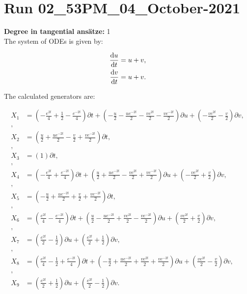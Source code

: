 \section*{Run 02\_53PM\_04\_October-2021}
\textbf{Degree in tangential ansätze:}	1\\
The system of ODEs is given by:

\begin{align*}
\dv{u}{t}&=u + v,\\
\dv{v}{t}&=u + v.\\
\end{align*}

\noindent The calculated generators are:

\begin{align*}
X_{1}&=\left( - \frac{e^{2 t}}{4} + \frac{1}{2} - \frac{e^{- 2 t}}{4} \right)\partial t+\left( - \frac{u}{2} - \frac{u e^{- 2 t}}{2} - \frac{v e^{2 t}}{2} - \frac{v e^{- 2 t}}{2} \right)\partial u+\left( - \frac{v e^{2 t}}{2} - \frac{v}{2} \right)\partial v,\\
,\\
X_{2}&=\left( \frac{u}{2} + \frac{u e^{- 2 t}}{2} - \frac{v}{2} + \frac{v e^{- 2 t}}{2} \right)\partial t,\\
,\\
X_{3}&=\left( 1 \right)\partial t,\\
,\\
X_{4}&=\left( - \frac{e^{2 t}}{4} + \frac{e^{- 2 t}}{4} \right)\partial t+\left( \frac{u}{2} + \frac{u e^{- 2 t}}{2} - \frac{v e^{2 t}}{2} + \frac{v e^{- 2 t}}{2} \right)\partial u+\left( - \frac{v e^{2 t}}{2} + \frac{v}{2} \right)\partial v,\\
,\\
X_{5}&=\left( - \frac{u}{2} + \frac{u e^{- 2 t}}{2} + \frac{v}{2} + \frac{v e^{- 2 t}}{2} \right)\partial t,\\
,\\
X_{6}&=\left( \frac{e^{2 t}}{4} - \frac{e^{- 2 t}}{4} \right)\partial t+\left( \frac{u}{2} - \frac{u e^{- 2 t}}{2} + \frac{v e^{2 t}}{2} - \frac{v e^{- 2 t}}{2} \right)\partial u+\left( \frac{v e^{2 t}}{2} + \frac{v}{2} \right)\partial v,\\
,\\
X_{7}&=\left( \frac{e^{2 t}}{2} - \frac{1}{2} \right)\partial u+\left( \frac{e^{2 t}}{2} + \frac{1}{2} \right)\partial v,\\
,\\
X_{8}&=\left( \frac{e^{2 t}}{4} - \frac{1}{2} + \frac{e^{- 2 t}}{4} \right)\partial t+\left( - \frac{u}{2} + \frac{u e^{- 2 t}}{2} + \frac{v e^{2 t}}{2} + \frac{v e^{- 2 t}}{2} \right)\partial u+\left( \frac{v e^{2 t}}{2} - \frac{v}{2} \right)\partial v,\\
,\\
X_{9}&=\left( \frac{e^{2 t}}{2} + \frac{1}{2} \right)\partial u+\left( \frac{e^{2 t}}{2} - \frac{1}{2} \right)\partial v.\\
\end{align*}
